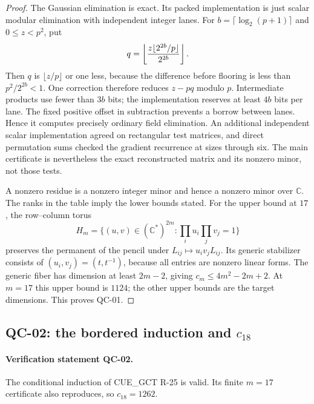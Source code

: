 \begin{proof}
The Gaussian elimination is exact. Its packed implementation is
just scalar modular elimination with independent integer lanes.
For $b=\lceil\log_2(p+1)\rceil$ and $0\leq z<p^2$, put
\[
 q=\left\lfloor {z\lfloor2^{2b}/p\rfloor\over2^{2b}}\right\rfloor.
\]
Then $q$ is $\lfloor z/p\rfloor$ or one less, because the difference
before flooring is less than $p^2/2^{2b}<1$. One correction therefore
reduces $z-pq$ modulo $p$. Intermediate products use fewer than $3b$
bits; the implementation reserves at least $4b$ bits per lane.
The fixed positive offset in subtraction prevents a borrow between
lanes. Hence it computes precisely ordinary field elimination.
An additional independent scalar implementation agreed on rectangular
test matrices, and direct permutation sums checked the gradient
recurrence at sizes through six. The main certificate is nevertheless
the exact reconstructed matrix and its nonzero minor, not those tests.

A nonzero residue is a nonzero integer minor and hence a nonzero
minor over $\mathbb C$. The ranks in the table imply the lower
bounds stated. For the upper bound at $17$, the row--column torus
\[
 H_m=\{(u,v)\in(\mathbb C^*)^{2m}:\prod_i u_i\prod_jv_j=1\}
\]
preserves the permanent of the pencil under $L_{ij}\mapsto u_iv_jL_{ij}$.
Its generic stabilizer consists of $(u_i,v_j)=(t,t^{-1})$, because
all entries are nonzero linear forms. The generic fiber has dimension
at least $2m-2$, giving $c_m\leq4m^2-2m+2$.
At $m=17$ this upper bound is $1124$; the other upper bounds are
the target dimensions. This proves QC-01.
\end{proof}

\subsection{QC-02: the bordered induction and $c_{18}$}

\paragraph{Verification statement QC-02.}
The conditional induction of CUE\_GCT R-25 is valid. Its finite
$m=17$ certificate also reproduces, so $c_{18}=1262$.

